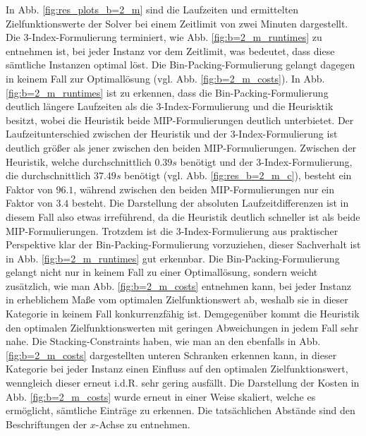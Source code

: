 In Abb. \ref{fig:res_plots_b=2_m} sind die Laufzeiten und ermittelten Zielfunktionswerte der Solver bei einem Zeitlimit von zwei Minuten dargestellt. Die 3-Index-Formulierung terminiert, wie Abb. \ref{fig:b=2_m_runtimes} zu entnehmen ist, bei jeder Instanz vor dem Zeitlimit, was bedeutet, dass diese sämtliche Instanzen optimal löst. Die Bin-Packing-Formulierung gelangt dagegen in keinem Fall zur Optimallösung (vgl. Abb. \ref{fig:b=2_m_costs}).
In Abb. \ref{fig:b=2_m_runtimes} ist zu erkennen, dass die Bin-Packing-Formulierung deutlich längere Laufzeiten als die 3-Index-Formulierung und die Heurisktik besitzt, wobei die Heuristik beide MIP-Formulierungen deutlich unterbietet.
Der Laufzeitunterschied zwischen der Heuristik und der 3-Index-Formulierung ist deutlich größer als jener zwischen den beiden MIP-Formulierungen. Zwischen der Heuristik, welche durchschnittlich $0.39s$ benötigt und der 3-Index-Formulierung, die durchschnittlich $37.49s$ benötigt (vgl. Abb. \ref{fig:res_b=2_m_c}), besteht ein Faktor von $96.1$, während zwischen den beiden MIP-Formulierungen nur ein Faktor von $3.4$ besteht. Die Darstellung der absoluten Laufzeitdifferenzen ist in diesem Fall also etwas irreführend, da die Heuristik deutlich schneller ist als beide MIP-Formulierungen. Trotzdem ist die 3-Index-Formulierung aus praktischer Perspektive klar der Bin-Packing-Formulierung vorzuziehen, dieser Sachverhalt ist in Abb. \ref{fig:b=2_m_runtimes} gut erkennbar.
Die Bin-Packing-Formulierung gelangt nicht nur in keinem Fall zu einer Optimallösung, sondern weicht zusätzlich,
wie man Abb. \ref{fig:b=2_m_costs} entnehmen kann, bei jeder Instanz in erheblichem Maße vom optimalen Zielfunktionswert ab, weshalb sie in dieser Kategorie in keinem Fall konkurrenzfähig ist. Demgegenüber kommt die Heuristik den optimalen Zielfunktionswerten mit geringen Abweichungen in jedem Fall sehr nahe.
Die Stacking-Constraints haben, wie man an den ebenfalls in Abb. \ref{fig:b=2_m_costs} dargestellten unteren Schranken erkennen kann, in dieser Kategorie bei jeder Instanz einen Einfluss auf den optimalen Zielfunktionswert,
wenngleich dieser erneut i.d.R. sehr gering ausfällt.
Die Darstellung der Kosten in Abb. \ref{fig:b=2_m_costs} wurde erneut in einer Weise skaliert, welche
es ermöglicht, sämtliche Einträge zu erkennen. Die tatsächlichen Abstände sind den Beschriftungen der $x$-Achse zu entnehmen.

